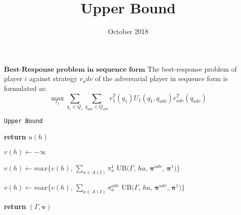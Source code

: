 \documentclass{article}
\title{Upper Bound}
\author{}
\date{October 2018}
\begin{document}
\noindent
$\textbf{Best-Response problem in sequence form}$
The best-response problem of player $i$ against strategy $r_adv$ of the adversarial player in sequence form is formulated as: \\




\begin{equation}
\max_{r_1} \sum_{q_1 \in Q_1} \sum_{q_{adv} \in Q_{adv}} r_1^T(q_1) U_1(q_1,q_{adv}) r_{adv}^T(q_{adv}) 
\end{equation}



\begin{algorithm}[!h]
	\caption{\texttt{Upper Bound}}
	\begin{scriptsize}
		\begin{algorithmic}

		    
		    \State\textbf{return} $u(h)$
		    \EndIf
		    
		    \State $v(h) \leftarrow -\infty$
		    
		    \State $v(h)\leftarrow max\{v(h)$, $\sum_{a \in A(I)} {\pi}_a^1$ UB$(\Gamma$, $ha$, $\bm{\pi}^{adv}$, $\bm{\pi}^1) \}$
		    \EndFor
		    \EndIf
		    
		    \State $v(h)\leftarrow max\{v(h)$, $\sum_{a \in A(I)} {\pi}_a^{adv}$ UB$(\Gamma$, $ha$, $\bm{\pi}^{adv}$, $\bm{\pi}^1) \}$
		    \EndFor
		    \EndIf
		    
		    \State\textbf{return} $(\Gamma,\textbf{v})$
		    \EndFunction
			
		\end{algorithmic}
	\end{scriptsize}
	\label{alg:UpperBound}
\end{algorithm}
\end{document}
